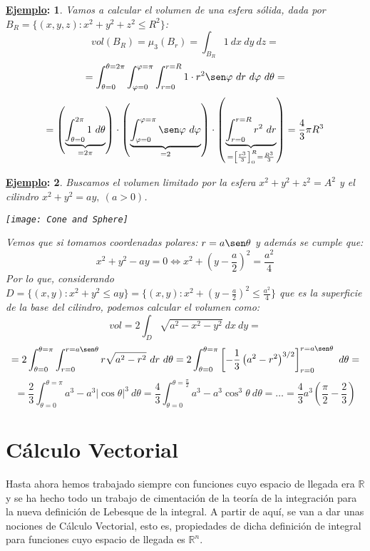 \documentclass[10pt,a4paper,openright]{book}
\theoremstyle{break}
\newtheorem*{ej}{\underline{Ejemplo}:}
\newcommand{\dif}[1]{\ d#1}
\begin{document}
\begin{ej}
Vamos a calcular el volumen de una esfera sólida, dada por $B_R = \{\left(x, y, z\right) : x^2 + y^2 + z^2 \le R^2\}$:
$$vol \left(B_R\right) = \mu_3 \left(B_r\right) = \int_{B_R} 1 \dif{x} \dif{y} \dif{z}=$$
$$= \int_{\theta = 0}^{\theta = 2\pi }\int_{\varphi = 0}^{\varphi = \pi} \int_{r = 0}^{r = R} 1 \cdot r^2 \sen \varphi \dif{r} \dif{\varphi } \dif{\theta} = $$
$$= \left(\underbrace{\int_{\theta = 0}^{2\pi }1 \dif{\theta }}_{= 2\pi} \right) \cdot \left(\underbrace{\int_{\varphi = 0}^{\varphi = \pi} \sen \varphi \dif{\varphi }}_{= 2}\right) \cdot \left(\underbrace{\int_{r = 0}^{r = R} r^2 \dif{r}}_{= \left[\frac{r^3}{3}\right]_0^R = \frac{R^3}{3}}\right) = \frac{4}{3} \pi R^3$$
\end{ej}

\begin{ej}
Buscamos el volumen limitado por la esfera $x^2 + y^2 + z^2 = A^2$ y el cilindro $x^2 + y^2 = ay,\ \left(a > 0\right)$.

\begin{center}
\texttt{[image: Cone and Sphere]}
\end{center}

Vemos que si tomamos coordenadas polares: $r = a\sen \theta$ y además se cumple que:
$$x^2 + y^2 - ay = 0 \Leftrightarrow x^2 + \left(y - \frac{a}{2}\right)^2 = \frac{a^2}{4}$$
Por lo que, considerando $D = \{\left(x, y\right): x^2 + y^2 \le ay\} = \{\left(x, y\right): x^2 + \left(y - \frac{a}{2}\right)^2 \le \frac{a^2}{4}\}$ que es la superficie de la base del cilindro, podemos calcular el volumen como: 
$$vol = 2 \int_{D} \sqrt{a^2 - x^2 - y^2} \dif{x} \dif{y} = $$
$$= 2 \int_{\theta = 0}^{\theta = \pi} \int_{r = 0}^{r = a\sen \theta } r \sqrt{a^2 - r^2} \dif{r} \dif{\theta} = 2 \int_{\theta = 0}^{\theta = \pi} \left[-\frac{1}{3} \left(a^2 - r^2 \right)^{3/2}\right]_{r = 0}^{r = a\sen \theta }\dif{\theta} = $$
$$= \frac{2}{3} \int_{\theta = 0}^{\theta = \pi} a^3 - a^3 \lvert \cos \theta  \rvert^3 \dif{\theta } = \frac{4}{3} \int_{\theta = 0}^{\theta = \frac{\pi}{2}} a^3 - a^3 \cos^3 \theta \dif{\theta } = \ldots = \boxed{\frac{4}{3}a^3 \left(\frac{\pi}{2} - \frac{2}{3}\right)} $$
\end{ej}

\chapter{Cálculo Vectorial}
Hasta ahora hemos trabajado siempre con funciones cuyo espacio de llegada era $\mathbb{R}$ y se ha hecho todo un trabajo de cimentación de la teoría de la integración para la nueva definición de Lebesque de la integral. A partir de aquí, se van a dar unas nociones de Cálculo Vectorial, esto es, propiedades de dicha definición de integral para funciones cuyo espacio de llegada es $\mathbb{R}^n$.
\end{document}
